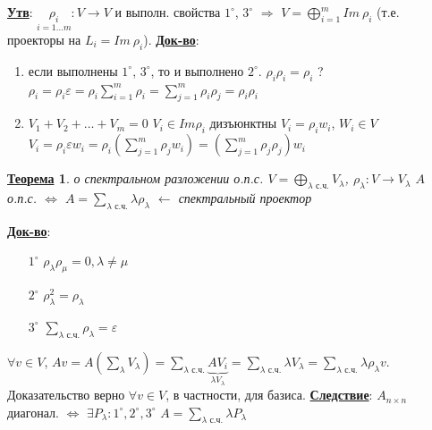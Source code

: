 \documentclass[12pt,a4paper]{article}
\newcommand{\bfline}[1]{\textbf{\underline{#1}}}
\newtheorem*{theorem*}{\bfline{Теорема}}
\begin{document}
\bfline{Утв}: $\underset{i=1\ldots m}{\rho_i} : V \rightarrow V$ и выполн. свойства $1^{\circ}$, $3^{\circ}$ $\Rightarrow$ $V = \bigoplus\limits_{i=1}^{m} Im\ \rho_i$ (т.е. проекторы на $L_i=Im\ \rho_i$). \newline
\bfline{Док-во}:
\begin{enumerate}
	\item если выполнены $1^{\circ}$, $3^{\circ}$, то и выполнено $2^{\circ}$. $\rho_i \rho_i = \rho_i$ ? \newline
		$\rho_i = \rho_i \varepsilon = \rho_i \sum\limits_{i=1}^{m} \rho_i = \sum\limits_{j=1}^{m} \rho_i \rho_j = \rho_i \rho_i$
	\item $V_1 + V_2 + \ldots + V_m = 0$ \newline
		$V_i \in Im \rho_i$ дизъюнктны \newline
		$V_i = \rho_i w_i$, $W_i \in V$ \newline
		$V_i = \rho_i \varepsilon w_i = \rho_i \left( \sum\limits_{j=1}^{m} \rho_j w_i \right) = \left( \sum\limits_{j=1}^{m} \rho_j \rho_j \right) w_i$
\end{enumerate}
\begin{theorem*}{о спектральном разложении о.п.с.}
$V = \bigoplus\limits_{\lambda \text{ с.ч.}} V_{\lambda}$, $\rho_{\lambda}: V \rightarrow V_{\lambda}$ \newline
$A$ о.п.с. $\Leftrightarrow$ $A = \sum\limits_{\lambda \text{ с.ч.}} \lambda \rho_{\lambda}$ $\leftarrow$ спектральный проектор
\end{theorem*}
\bfline{Док-во}:
\begin{enumerate}
	\item[$1^{\circ}$] $\rho_{\lambda} \rho_{\mu} = 0, \lambda \neq \mu$
	\item[$2^{\circ}$] $\rho_{\lambda}^2 = \rho_{\lambda}$
	\item[$3^{\circ}$] $\sum\limits_{\lambda \text{ с.ч.}} \rho_{\lambda} = \varepsilon$
\end{enumerate}
$\forall v \in V$, $Av = A\left( \sum\limits_{\lambda} V_{\lambda} \right) = \sum\limits_{\lambda \text{ с.ч.}} \underset{\lambda V_{\lambda}}{\underbrace{A V_i}} = \sum\limits_{\lambda \text{ с.ч.}} \lambda V_{\lambda} = \sum\limits_{\lambda \text{ с.ч.}} \lambda \rho_{\lambda} v$. Доказательство верно $\forall v \in V$, в частности, для базиса. \newline
\bfline{Следствие}: $A_{n \times n}$ диагонал. $\Leftrightarrow$ $\exists P_{\lambda} : 1^{\circ}, 2^{\circ}, 3^{\circ}$ \newline
$A = \sum\limits_{\lambda \text{ с.ч.}} \lambda P_{\lambda}$ \newline
\end{document}
